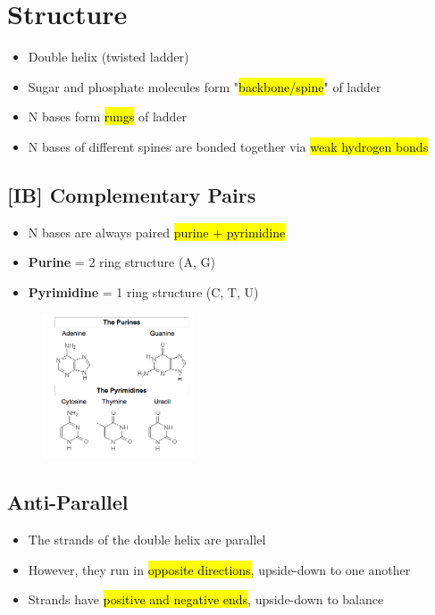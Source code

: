 \documentclass[a4paper,12pt]{article}
\begin{document}
\section{Structure}
\begin{itemize}
    \item{Double helix (twisted ladder)}
    \item{Sugar and phosphate molecules form "\hl{backbone/spine}" of ladder}
    \item{N bases form \hl{rungs} of ladder}
    \item{N bases of different spines are bonded together via \hl{weak hydrogen bonds}}
\end{itemize}

\subsection{[IB] Complementary Pairs}
\begin{itemize}
    \item{N bases are always paired \hl{purine + pyrimidine}}
    \item{\textbf{Purine} = 2 ring structure (A, G)}
    \item{\textbf{Pyrimidine} = 1 ring structure (C, T, U)}
\end{itemize}

\begin{figure}[H]
    \centering
    \includegraphics[width=0.40\textwidth]{ring}
\end{figure}

\subsection{Anti-Parallel}
\begin{itemize}
    \item{The strands of the double helix are parallel}
    \item{However, they run in \hl{opposite directions}, upside-down to one another}
    \item{Strands have \hl{positive and negative ends}, upside-down to balance}
\end{itemize}
\end{document}
